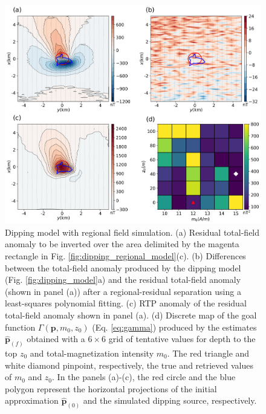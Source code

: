 \begin{figure}
    \centering
    \includegraphics[width=\linewidth]{figures/regional_rtp.png}
    \caption{Dipping model with regional field simulation. (a) Residual total-field
    anomaly to be inverted over the area delimited by the  magenta rectangle 
    in Fig. \ref{fig:dipping_regional_model}(c). 
    (b) Differences between the total-field anomaly produced by the dipping model
    (Fig. \ref{fig:dipping_model}a) and the residual total-field anomaly (shown in
    panel (a)) after a regional-residual separation using a least-squares polynomial
    fitting. 
    (c) RTP anomaly of the  residual total-field anomaly shown in panel (a). 
    (d) Discrete map of the goal function $\Gamma(\mathbf{p}, m_0, z_0)$ (Eq.
    \ref{eq:gamma}) produced by the estimates $\hat{\mathbf{p}}_{(f)}$ obtained with
    a $6 \times 6$ grid of tentative values for depth to the top $z_0$ and
    total-magnetization intensity $m_0$.
    The red triangle  and white diamond pinpoint, respectively, the true and
    retrieved values of $m_0$  and $z_0$.
    In the panels (a)-(c), the red circle and the blue polygon represent the
    horizontal projections of the initial approximation $\hat{\mathbf{p}}_{(0)}$ 
    and the simulated dipping source, respectively.
}
    \label{fig:dipping_regional_rtp}
\end{figure}


